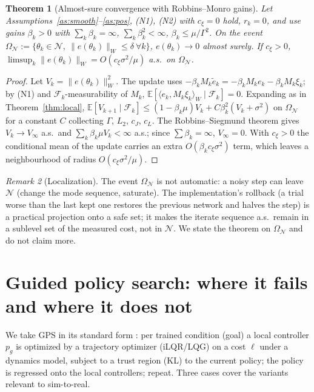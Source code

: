 \documentclass[11pt]{article}
\newtheorem{theorem}{Theorem}
\theoremstyle{definition}
\theoremstyle{remark}
\newtheorem{remark}[theorem]{Remark}
\newcommand{\E}{\mathbb{E}}
\newcommand{\cN}{\mathcal{N}}
\newcommand{\cF}{\mathcal{F}}
\newcommand{\ip}[2]{\langle #1,#2\rangle_W}
\newcommand{\nW}[1]{\lVert #1\rVert_W}
\begin{document}
\begin{theorem}[Almost-sure convergence with Robbins--Monro gains]\label{thm:stoch}
Let Assumptions~\ref{as:smooth}--\ref{as:pos}, (N1), (N2) with $c_\xi=0$ hold, $r_k=0$, and use gains
$\beta_k>0$ with $\sum_k\beta_k=\infty$, $\sum_k\beta_k^2<\infty$, $\beta_k\le\mu/\Gamma^2$. On the event
$\Omega_\cN:=\{\theta_k\in\cN,\ \nW{e(\theta_k)}\le\delta\ \forall k\}$, $e(\theta_k)\to0$ almost surely. If
$c_\xi>0$, $\limsup_k\nW{e(\theta_k)}=O(c_\xi\sigma^2/\mu)$ a.s.\ on $\Omega_\cN$.
\end{theorem}
\begin{proof}
Let $V_k=\nW{e(\theta_k)}^2$. The update uses $-\beta_k M_k\tilde e_k=-\beta_kM_ke_k-\beta_kM_k\xi_k$; by (N1) and
$\cF_k$-measurability of $M_k$, $\E[\ip{e_k}{M_k\xi_k}\mid\cF_k]=0$. Expanding as in Theorem~\ref{thm:local},
$\E[V_{k+1}\mid\cF_k]\le(1-\beta_k\mu)V_k+C\beta_k^2(V_k+\sigma^2)$ on $\Omega_\cN$ for a constant $C$ collecting
$\Gamma$, $L_2$, $c_J$, $c_L$. The Robbins--Siegmund theorem gives $V_k\to V_\infty$ a.s.\ and
$\sum_k\beta_k\mu V_k<\infty$ a.s.; since $\sum\beta_k=\infty$, $V_\infty=0$. With $c_\xi>0$ the conditional mean of the
update carries an extra $O(\beta_kc_\xi\sigma^2)$ term, which leaves a neighbourhood of radius $O(c_\xi\sigma^2/\mu)$.
\end{proof}
\begin{remark}[Localization]
The event $\Omega_\cN$ is not automatic: a noisy step can leave $\cN$ (change the mode sequence, saturate). The
implementation's rollback (a trial worse than the last kept one restores the previous network and halves the step) is a
practical projection onto a safe set; it makes the iterate sequence a.s.\ remain in a sublevel set of the measured cost,
not in $\cN$. We state the theorem on $\Omega_\cN$ and do not claim more.
\end{remark}

\section{Guided policy search: where it fails and where it does not}\label{sec:gps}

We take GPS in its standard form \cite{levine2013gps,levine2014unknown,montgomery2016mdgps}: per trained condition
(goal) a local controller $p_g$ is optimized by a trajectory optimizer (iLQR/LQG) on a cost $\ell$ under a dynamics
model, subject to a trust region (KL) to the current policy; the policy is regressed onto the local controllers; repeat.
Three cases cover the variants relevant to sim-to-real.
\end{document}
